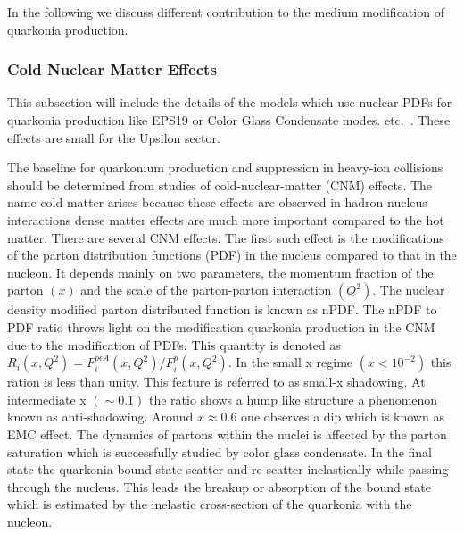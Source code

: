 In the following we discuss different contribution to the medium modification of quarkonia production. 

     
              
\subsubsection{Cold Nuclear Matter Effects}
{\color{red} This subsection will include the details of the models which use nuclear PDFs for quarkonia production
like EPS19 or Color Glass Condensate modes. etc.~\cite{}. These effects are small for the Upsilon sector. }

The baseline for quarkonium production and suppression in heavy-ion collisions 
should be determined from studies of
cold-nuclear-matter (CNM) effects. The name cold matter 
arises because these effects are observed in hadron-nucleus interactions 
dense matter effects are much more important compared to the hot matter.  There are several 
CNM effects. The first such effect is the modifications of the parton 
distribution functions (PDF) in the nucleus compared to that in the nucleon. It depends mainly on two parameters, 
the momentum fraction of the parton $(x)$ and the scale of the parton-parton 
interaction $(Q^2)$. The nuclear density modified parton distributed function is known 
as nPDF. The nPDF to PDF ratio throws light on the modification quarkonia production 
in the CNM due to the modification of PDFs. This quantity is denoted as $R_i(x,Q^2)=F_i^{p \epsilon A} (x, Q^2) /
F_i^p  (x, Q^2)$. In the small x regime $(x < 10^{-2})$ this ration is less than unity. This feature is referred to as 
small-x shadowing. At intermediate x $(\sim 0.1)$ the ratio shows a hump like structure a phenomenon known as 
anti-shadowing. Around $x\approx 0.6$ one observes a dip which is known as EMC effect. The dynamics of partons 
within the nuclei is affected by the parton saturation which is successfully studied by color glass condensate. In the 
final state the quarkonia bound state scatter and re-scatter inelastically while passing through the nucleus. This leads 
the breakup or absorption of the bound state which is estimated by the inelastic cross-section of the quarkonia with 
the nucleon. 

